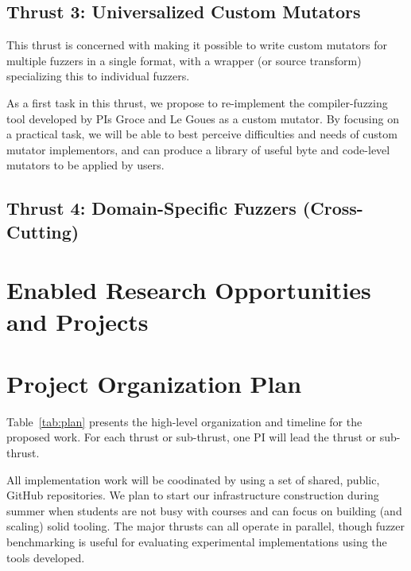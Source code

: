 \documentclass[numbers]{proposalnsf}
\begin{document}
\subsection{Thrust 3: Universalized Custom Mutators}

This thrust is concerned with making it possible to write custom mutators for multiple fuzzers in a single format, with a wrapper (or source transform) specializing this to individual fuzzers.

As a first task in this thrust, we propose to re-implement the compiler-fuzzing tool developed by PIs Groce and Le Goues as a custom mutator.  By focusing on a practical task, we will be able to best perceive difficulties and needs of custom mutator implementors, and can produce a library of useful byte and code-level mutators to be applied by users.

\subsection{Thrust 4:  Domain-Specific Fuzzers (Cross-Cutting)}

\section{Enabled Research Opportunities and Projects}

\section{Project Organization Plan}

%
\label{sec:plan}


Table~\ref{tab:plan} presents the high-level organization and timeline for the proposed
work. For each thrust or sub-thrust, one PI will lead the thrust or sub-thrust.


All implementation work will be coodinated by using a set of shared, public, GitHub repositories.    We plan to start our
infrastructure construction during summer when students are
not busy with courses and can focus on
building (and scaling) solid tooling.  The major thrusts can all operate in parallel, though fuzzer benchmarking is useful for evaluating experimental implementations using the tools developed.
\end{document}
